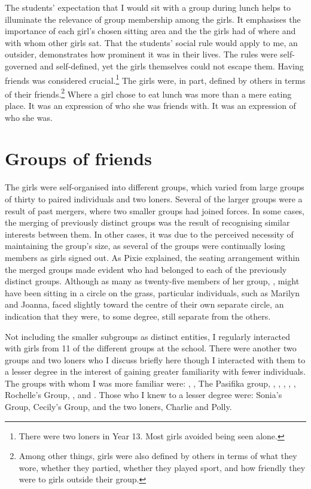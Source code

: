 The students' expectation that I would sit with a group during lunch helps to illuminate the relevance of group membership among the girls. It emphasises the importance of each girl's chosen sitting area and the  the girls had of where and with whom other girls sat. That the students' social rule would apply to me, an outsider, demonstrates how prominent it was in their lives. The rules were self-governed and self-defined, yet the girls themselves could not escape them. Having friends was considered crucial.\footnote{There were two loners in Year 13. Most girls avoided being seen alone.}  The girls were, in part, defined by others in terms of their friends.\footnote{Among other things, girls were also defined by others in terms of what they wore, whether they partied, whether they played sport, and how friendly they were to girls outside their group.}  Where a girl chose to eat lunch was more than a mere eating place. It was an expression of who she was friends with. It was an expression of who she was.



\section{Groups of friends}\label{lunchlocale}

The girls were self-organised into different groups, which varied from large groups of thirty to paired individuals and two loners. Several of the larger groups were a result of past mergers, where two smaller groups had joined forces. In some cases, the merging of previously distinct groups was the result of recognising similar interests between them. In other cases, it was due to the perceived necessity of maintaining the group's size, as several of the groups were continually losing members as girls signed out. As Pixie explained, the seating arrangement within the merged groups made evident who had belonged to each of the previously distinct groups. Although as many as twenty-five members of her group, , might have been sitting in a circle on the grass, particular individuals, such as Marilyn and Joanna, faced slightly toward the centre of their own separate circle, an indication that they were, to some degree, still separate from the others. 


Not including the smaller subgroups as distinct entities, I regularly interacted with girls from 11 of the different groups at the school. There were another two groups and two loners who I discuss briefly here though I interacted with them to a lesser degree in the interest of gaining greater familiarity with fewer individuals. The groups with whom I was more familiar were: , , The Pasifika group, , , , , , Rochelle's Group, , and . Those who I knew to a lesser degree were: Sonia's Group, Cecily's Group, and the two loners, Charlie and Polly. 

